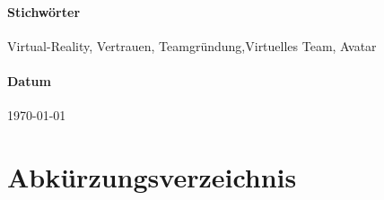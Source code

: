 \documentclass[a4paper,11pt]{article}%
\renewcommand{\\}{\vspace*{0.5\baselineskip} \newline}
\begin{document}
			\paragraph{Stichwörter}
			Virtual-Reality, Vertrauen, Teamgründung,Virtuelles Team, Avatar
			
			\paragraph{Datum}
			{\today}
	\newpage
	\tableofcontents
	\newpage
	
\listoffigures%
\newpage
\listoftables%
\newpage
	
\section*{Abkürzungsverzeichnis}
	
	
	\newpage
	
%	
	


%
\end{document}
